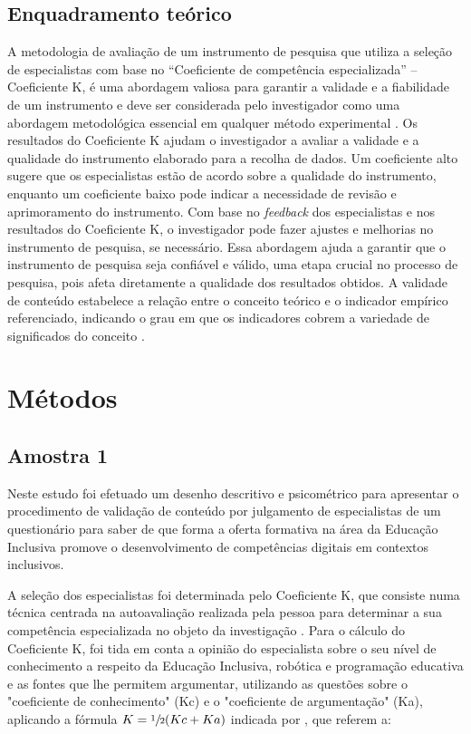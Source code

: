 \documentclass[portuguese]{textolivre}
\begin{document}
\subsection{Enquadramento teórico}\label{sec-normas}
A metodologia de avaliação de um instrumento de pesquisa que utiliza a seleção de especialistas com base no “Coeficiente de competência especializada” – Coeficiente K, é uma abordagem valiosa para garantir a validade e a fiabilidade de um instrumento e deve ser considerada pelo investigador como uma abordagem metodológica essencial em qualquer método experimental \cite{betancurth_loaiza_validation_2015,cabero_almenara_utilizacion_2013,ventura-silva_escala_2023}. Os resultados do Coeficiente K ajudam o investigador a avaliar a validade e a qualidade do instrumento elaborado para a recolha de dados. Um coeficiente alto sugere que os especialistas estão de acordo sobre a qualidade do instrumento, enquanto um coeficiente baixo pode indicar a necessidade de revisão e aprimoramento do instrumento. Com base no \textit{feedback} dos especialistas e nos resultados do Coeficiente K, o investigador pode fazer ajustes e melhorias no instrumento de pesquisa, se necessário. Essa abordagem ajuda a garantir que o instrumento de pesquisa seja confiável e válido, uma etapa crucial no processo de pesquisa, pois afeta diretamente a qualidade dos resultados obtidos. A validade de conteúdo estabelece a relação entre o conceito teórico e o indicador empírico referenciado, indicando o grau em que os indicadores cobrem a variedade de significados do conceito \cite{nora_validacao_2018}.


\section{Métodos}\label{sec-conduta}
\subsection{Amostra 1}
Neste estudo foi efetuado um desenho descritivo e psicométrico para apresentar o procedimento de validação de conteúdo por julgamento de especialistas de um questionário para saber de que forma a oferta formativa na área da Educação Inclusiva promove o desenvolvimento de competências digitais em contextos inclusivos.

A seleção dos especialistas foi determinada pelo Coeficiente K, que consiste numa técnica centrada na autoavaliação realizada pela pessoa para determinar a sua competência especializada no objeto da investigação \cite{cabero_almenara_utilizacion_2013}. Para o cálculo do Coeficiente K, foi tida em conta a opinião do especialista sobre o seu nível de conhecimento a respeito da Educação Inclusiva, robótica e programação educativa e as fontes que lhe permitem argumentar, utilizando as questões sobre o "coeficiente de conhecimento" (Kc) e o "coeficiente de argumentação" (Ka), aplicando a fórmula $K= \sfrac{1}{2} (Kc+Ka)$ indicada por \textcite[p. 29]{cabero_almenara_utilizacion_2013}, que referem a:
\end{document}
